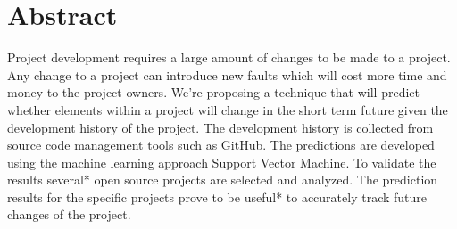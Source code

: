 \chapter*{Abstract}

Project development requires a large amount of changes to be made to a project. Any change to a project can introduce new faults which will cost more time and money to the project owners. We're proposing a technique that will predict whether elements within a project will change in the short term future given the development history of the project. The development history is collected from source code management tools such as GitHub. The predictions are developed using the machine learning approach Support Vector Machine. To validate the results several* open source projects are selected and analyzed. The prediction results for the specific projects prove to be useful* to accurately track future changes of the project.

